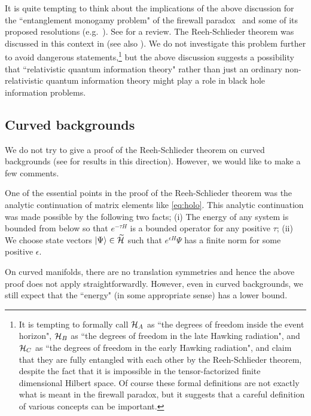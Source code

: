 \documentclass[a4paper,11pt]{article}
\theoremstyle{plain}
\theoremstyle{definition}
\numberwithin{thm}{section}
\newcommand{\ket}[1]{ | {#1} \rangle }
\def\CH{{\cal H}}
\begin{document}
It is quite tempting to think about the implications of the above discussion for the ``entanglement monogamy problem" of the firewall paradox~\cite{Almheiri:2012rt}
and some of its proposed resolutions 
(e.g.~\cite{Papadodimas:2012aq, Maldacena:2013xja, Bousso:2012as, Harlow:2013tf, Papadodimas:2013wnh,Papadodimas:2013jku,Verlinde:2013qya}). 
See \cite{Harlow:2014yka} for a review.
The Reeh-Schlieder theorem was discussed in this context in \cite{Papadodimas:2013jku} (see also \cite{Chakraborty:2017pmn}).
We do not investigate this problem further to avoid dangerous statements,\footnote{It is tempting to formally call
$\CH_A$ as ``the degrees of freedom inside the event horizon", $\CH_B$ as ``the degrees of freedom in the late Hawking radiation", and $\CH_C$ as
``the degrees of freedom in the early Hawking radiation", and claim that they are fully entangled with each other by the Reeh-Schlieder theorem, 
despite the fact that it is impossible in the tensor-factorized finite dimensional Hilbert space. Of course these formal definitions are not exactly what is meant in the firewall paradox, but
it suggests that a careful definition of various concepts can be important. }
but the above discussion suggests a possibility that ``relativistic quantum information theory" rather than just an ordinary non-relativistic quantum information theory might
play a role in black hole information problems. 




\subsection{Curved backgrounds} \label{sec:Curved}
We do not try to give a proof of the Reeh-Schlieder theorem on curved backgrounds (see \cite{Strohmaier:2002mm,Gerard:2017apb,Sanders:2008gs, Morrison:2014jha} for results in this direction).
However, we would like to make a few comments.

One of the essential points in the proof of the Reeh-Schlieder theorem was the analytic continuation of matrix elements like \eqref{eq:holo}.
This analytic continuation was made possible by the following two facts; (i) The energy of any system is bounded from below so that $e^{-\tau H}$ is a bounded operator for 
any positive $\tau$;
(ii) We choose state vectors $\ket{\Psi} \in \widetilde{\CH}$ such that $e^{\epsilon H} \Psi$ has a finite norm for some positive $\epsilon$.

On curved manifolds, there are no translation symmetries and hence the above proof does not apply straightforwardly.
However, even in curved backgrounds, we still expect that the ``energy" (in some appropriate sense) has a lower bound.
\end{document}
